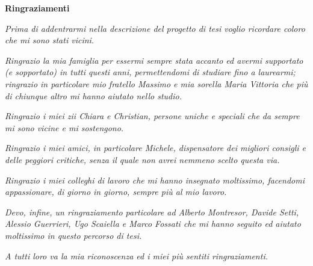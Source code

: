 \begin{center}
  {\bf \Huge Ringraziamenti}
\end{center}

\vspace{4cm}

\emph{
Prima di addentrarmi nella descrizione del progetto di tesi voglio ricordare coloro che mi sono stati vicini.
}

\emph{
Ringrazio la mia famiglia per essermi sempre stata accanto ed avermi supportato (e sopportato) in tutti questi anni, permettendomi di studiare fino a laurearmi; ringrazio in particolare mio fratello Massimo e mia sorella Maria Vittoria che più di chiunque altro mi hanno aiutato nello studio.
}

\emph{
Ringrazio i miei zii Chiara e Christian, persone uniche e speciali che da sempre mi sono vicine e mi sostengono. 
}

\emph{
Ringrazio i miei amici, in particolare Michele, dispensatore dei migliori consigli e delle peggiori critiche, senza il quale non avrei nemmeno scelto questa via.
}

\emph{
Ringrazio i miei colleghi di lavoro che mi hanno insegnato moltissimo, facendomi appassionare, di giorno in giorno, sempre più al mio lavoro. 
}

\emph{
Devo, infine, un ringraziamento particolare ad Alberto Montresor, Davide Setti, Alessio Guerrieri, Ugo Scaiella e Marco Fossati che mi hanno seguito ed aiutato moltissimo in questo percorso di tesi.
}

\emph{
A tutti loro va la mia riconoscenza ed i miei più sentiti ringraziamenti.
}
